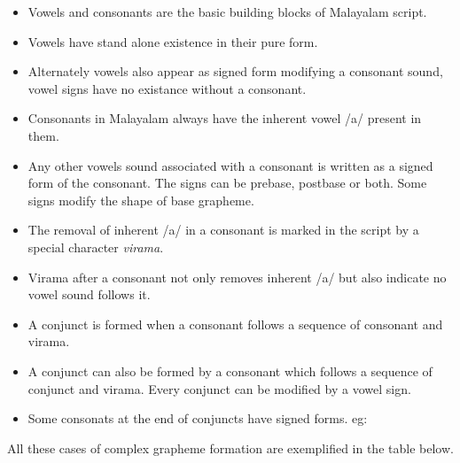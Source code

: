 \documentclass[10pt]{article}
\begin{document}
\begin{itemize}
\item
Vowels and consonants are the basic building blocks of Malayalam script.
\item
 Vowels have stand alone existence in their pure form. 
\item
Alternately vowels also appear as signed form modifying a consonant sound, vowel signs have no existance  without a consonant. 
\item Consonants in Malayalam always have the inherent vowel /a/ present in them.
\item
 Any other vowels sound associated with a consonant is written as a signed form of the consonant. The signs can be prebase, postbase or both. Some signs modify the shape of base grapheme.
\item
The removal of inherent /a/ in a consonant is marked in the script by a special character \textit{virama}. 
\item
Virama after a consonant not only removes inherent /a/ but also indicate no vowel sound follows it. 
\item
A conjunct is formed when a consonant follows a sequence of consonant and virama.
\item
 A conjunct can also be formed by a consonant which follows a sequence of conjunct and virama. Every conjunct can be modified by a vowel sign.  
\item
Some consonats at the end of conjuncts have signed forms. eg: 

\end{itemize}



All these cases of complex grapheme formation are exemplified in the table below.
\newline

\myfont
\end{document}
